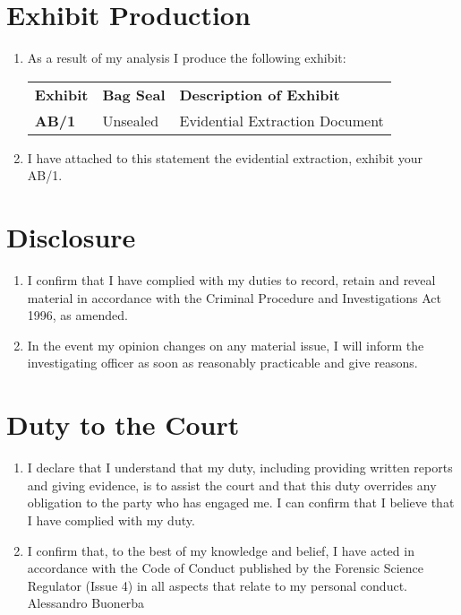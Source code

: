 \documentclass[11pt]{article}
\begin{document}
\section*{Exhibit Production}
\begin{enumerate}[resume]
    \item As a result of my analysis I produce the following exhibit:

    \begin{tabular}{lll}
    \textbf{Exhibit} & \textbf{Bag Seal} & \textbf{Description of Exhibit} \\
    \textbf{AB/1} & Unsealed & Evidential Extraction Document \\
    \end{tabular}

    \item I have attached to this statement the evidential extraction, exhibit your AB/1.
\end{enumerate}

\section*{Disclosure}
\begin{enumerate}[resume]
    \item I confirm that I have complied with my duties to record, retain and reveal material in accordance with the Criminal Procedure and Investigations Act 1996, as amended.
    \item In the event my opinion changes on any material issue, I will inform the investigating officer as soon as reasonably practicable and give reasons.
\end{enumerate}

\section*{Duty to the Court}
\begin{enumerate}[resume]
    \item I declare that I understand that my duty, including providing written reports and giving evidence, is to assist the court and that this duty overrides any obligation to the party who has engaged me. I can confirm that I believe that I have complied with my duty.
    \item I confirm that, to the best of my knowledge and belief, I have acted in accordance with the Code of Conduct published by the Forensic Science Regulator (Issue 4) in all aspects that relate to my personal conduct. Alessandro Buonerba
\end{enumerate}


\hspace{1in} 
\end{document}
